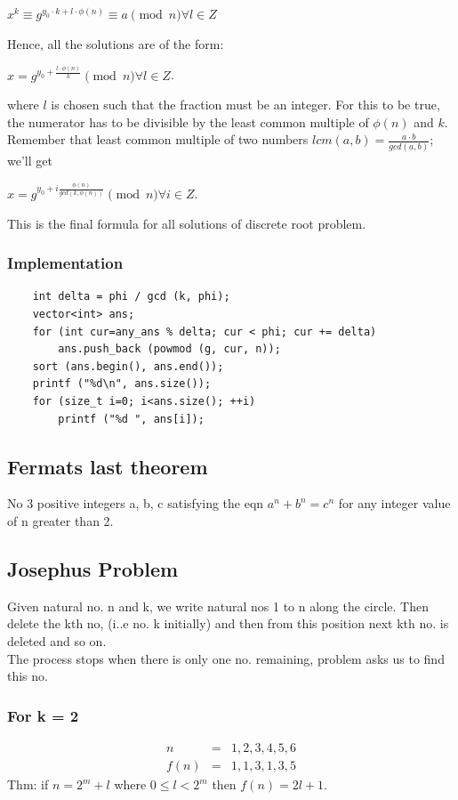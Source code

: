 \documentclass[8pt, a4paper, oneside, twocolumn]{extarticle}
\begin{document}
$x^k \equiv g^{ y_0 \cdot k + l \cdot \phi (n)} \equiv a \pmod n \forall l \in Z$

Hence, all the solutions are of the form:

$x = g^{y_0 + \frac {l \cdot \phi (n)}{k}} \pmod n \forall l \in Z$.

where $l$ is chosen such that the fraction must be an integer. For this to be true, the numerator has to be divisible by the least common multiple of $\phi (n)$ and $k$. Remember that least common multiple of two numbers $lcm(a, b) = \frac{a \cdot b}{gcd(a, b)}$; we'll get

$x = g^{y_0 + i \frac {\phi (n)}{gcd(k, \phi (n))}} \pmod n \forall i \in Z$.

This is the final formula for all solutions of discrete root problem.
\subsubsection{Implementation}
\begin{verbatim}
    int delta = phi / gcd (k, phi);
	vector<int> ans;
	for (int cur=any_ans % delta; cur < phi; cur += delta)
		ans.push_back (powmod (g, cur, n));
	sort (ans.begin(), ans.end());
	printf ("%d\n", ans.size());
	for (size_t i=0; i<ans.size(); ++i)
		printf ("%d ", ans[i]);
\end{verbatim}
\subsection{Fermats last theorem}
No 3 positive integers a, b, c satisfying the eqn $a^n + b^n = c^n$ for any integer value of n greater than 2.
\subsection{Josephus Problem}
Given natural no. n and k, we write natural nos 1 to n along the circle. Then delete the kth no, (i..e no. k initially) and then from this position next kth no. is deleted and so on.
\\The process stops when there is only one no. remaining, problem asks us to find this no.
\subsubsection{For k = 2}
\begin{eqnarray}n & = & 1, 2, 3, 4, 5, 6\\
f(n) & = & 1, 1, 3, 1, 3, 5
\end{eqnarray}
Thm: if $n = 2^m + l$ where $0 \leq l < 2^m$ then $f(n) = 2l + 1$.
\end{document}
